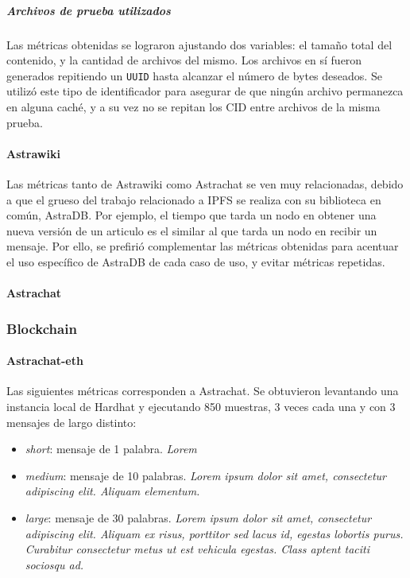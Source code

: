 \subparagraph{Archivos de prueba utilizados} Las métricas obtenidas se lograron ajustando dos variables: el tamaño total del contenido, y la cantidad de archivos del mismo. Los archivos en sí fueron generados repitiendo un \texttt{UUID} hasta alcanzar el número de bytes deseados. Se utilizó este tipo de identificador para asegurar de que ningún archivo permanezca en alguna caché, y a su vez no se repitan los CID entre archivos de la misma prueba.


\paragraph{Astrawiki}

Las métricas tanto de Astrawiki como Astrachat se ven muy relacionadas, debido a que el grueso del trabajo relacionado a IPFS se realiza con su biblioteca en común, AstraDB. Por ejemplo, el tiempo que tarda un nodo en obtener una nueva versión de un articulo es el similar al que tarda un nodo en recibir un mensaje. Por ello, se prefirió complementar las métricas obtenidas para acentuar el uso específico de AstraDB de cada caso de uso, y evitar métricas repetidas. 

\paragraph{Astrachat}

\subsubsection{Blockchain}

\paragraph{Astrachat-eth}

Las siguientes métricas corresponden a Astrachat. Se obtuvieron levantando una instancia local de Hardhat \cite{hardhat} y ejecutando 850 muestras, 3 veces cada una y con 3 mensajes de largo distinto:

\begin{itemize}
    \item \textit{short}: mensaje de 1 palabra. \textit{Lorem}
    \item \textit{medium}: mensaje de 10 palabras. \textit{Lorem ipsum dolor sit amet, consectetur adipiscing elit. Aliquam elementum.}
    \item \textit{large}: mensaje de 30 palabras. \textit{Lorem ipsum dolor sit amet, consectetur adipiscing elit. Aliquam ex risus, porttitor sed lacus id, egestas lobortis purus. Curabitur consectetur metus ut est vehicula egestas. Class aptent taciti sociosqu ad.}
\end{itemize}

